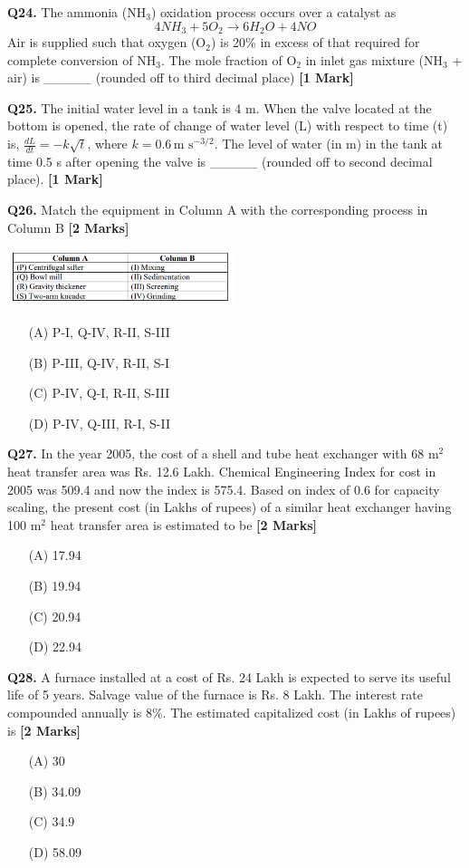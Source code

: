 \documentclass[11pt]{article}
\newcommand{\questiona}[2]{
    \noindent\textbf{Q#2.} #1 \hfill \textbf{[1 Mark]}
}
\newcommand{\questionb}[2]{
    \noindent\textbf{Q#2.} #1 \hfill \textbf{[2 Marks]}
}
\begin{document}
\questiona{The ammonia (NH\(_3\)) oxidation process occurs over a catalyst as
\[ 4 NH_3 + 5O_2 \rightarrow 6H_2O + 4NO \]
Air is supplied such that oxygen (O\(_2\)) is 20\% in excess of that required for complete conversion of NH\(_3\). The mole fraction of O\(_2\) in inlet gas mixture (NH\(_3\) + air) is \_\_\_\_\_ (rounded off to third decimal place)}{24}

\questiona{The initial water level in a tank is 4 m. When the valve located at the bottom is opened, the rate of change of water level (L) with respect to time (t) is, \(\frac{dL}{dt} = -k\sqrt{t}\), where \(k = 0.6 \, \text{m s}^{-3/2}\). The level of water (in m) in the tank at time 0.5 s after opening the valve is \_\_\_\_\_ (rounded off to second decimal place).}{25}

\questionb{Match the equipment in Column A with the corresponding process in Column B}{26}
\begin{center}
\includegraphics[width=0.5\textwidth]{figures/Q26.png}
\end{center}
\begin{enumerate}
    \item[(A)] P-I, Q-IV, R-II, S-III  
    \item[(B)] P-III, Q-IV, R-II, S-I  
    \item[(C)] P-IV, Q-I, R-II, S-III  
    \item[(D)] P-IV, Q-III, R-I, S-II  
\end{enumerate}

\questionb{In the year 2005, the cost of a shell and tube heat exchanger with 68 m\(^2\) heat transfer area was Rs. 12.6 Lakh. Chemical Engineering Index for cost in 2005 was 509.4 and now the index is 575.4. Based on index of 0.6 for capacity scaling, the present cost (in Lakhs of rupees) of a similar heat exchanger having 100 m\(^2\) heat transfer area is estimated to be}{27}
\begin{enumerate}
    \item[(A)] 17.94  
    \item[(B)] 19.94  
    \item[(C)] 20.94  
    \item[(D)] 22.94  
\end{enumerate}

\questionb{A furnace installed at a cost of Rs. 24 Lakh is expected to serve its useful life of 5 years. Salvage value of the furnace is Rs. 8 Lakh. The interest rate compounded annually is 8\%. The estimated capitalized cost (in Lakhs of rupees) is}{28}
\begin{enumerate}
    \item[(A)] 30  
    \item[(B)] 34.09  
    \item[(C)] 34.9  
    \item[(D)] 58.09  
\end{enumerate}
\end{document}
